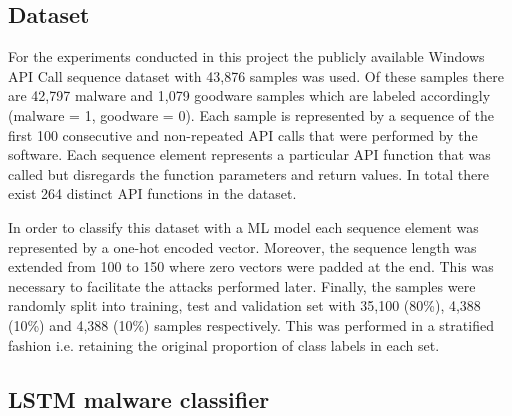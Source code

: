 \documentclass[final]{cvpr}
\begin{document}
\subsection{Dataset}
For the experiments conducted in this project the publicly available Windows 
API Call sequence dataset \autocite{tqqm-aq14-19} with 43,876 samples was used. 
Of these samples there are 42,797 malware and 1,079 goodware samples which are 
labeled accordingly (malware = 1, goodware = 0). Each sample is represented by 
a sequence of the first 100 consecutive and non-repeated API calls that were 
performed by the software. Each sequence element represents a particular API 
function that was called but disregards the function parameters and return 
values. In total there exist 264 distinct API functions in the dataset. 
\autocite{tqqm-aq14-19}

In order to classify this dataset with a ML model each sequence element was 
represented by a one-hot encoded vector. Moreover, the sequence length was 
extended from 100 to 150 where zero vectors were padded at the end. This was 
necessary to facilitate the attacks performed later. Finally, the samples were 
randomly split into 
training, test and validation set with 35,100 (80\%), 4,388 (10\%) and 4,388 
(10\%) samples respectively. This was performed in a stratified fashion i.e. 
retaining the original proportion of class labels in each set.
\subsection{LSTM malware classifier}
\end{document}
